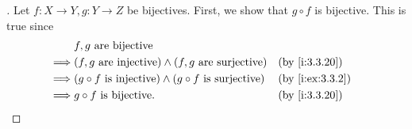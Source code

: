 \begin{proof}[]
  Let \(f : X \to Y, g : Y \to Z\) be bijectives.
  First, we show that \(g \circ f\) is bijective.
  This is true since
  \begin{align*}
             & f, g \text{ are bijective}                                                                    \\
    \implies & (f, g \text{ are injective}) \land (f, g \text{ are surjective})         &  & \by{i:3.3.20}   \\
    \implies & (g \circ f \text{ is injective}) \land (g \circ f \text{ is surjective}) &  & \by{i:ex:3.3.2} \\
    \implies & g \circ f \text{ is bijective}.                                          &  & \by{i:3.3.20}
  \end{align*}


\end{proof}

